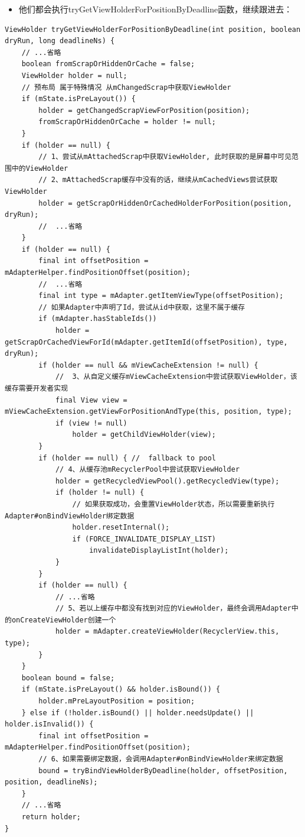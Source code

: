 \documentclass[9pt, b5paper]{article}
\begin{document}
\begin{itemize}
\item 他们都会执行tryGetViewHolderForPositionByDeadline函数，继续跟进去：
\end{itemize}
\begin{verbatim}
ViewHolder tryGetViewHolderForPositionByDeadline(int position, boolean dryRun, long deadlineNs) { 
    // ...省略     
    boolean fromScrapOrHiddenOrCache = false; 
    ViewHolder holder = null; 
    // 预布局 属于特殊情况 从mChangedScrap中获取ViewHolder 
    if (mState.isPreLayout()) { 
        holder = getChangedScrapViewForPosition(position); 
        fromScrapOrHiddenOrCache = holder != null; 
    } 
    if (holder == null) { 
        // 1、尝试从mAttachedScrap中获取ViewHolder, 此时获取的是屏幕中可见范围中的ViewHolder 
        // 2、mAttachedScrap缓存中没有的话，继续从mCachedViews尝试获取ViewHolder 
        holder = getScrapOrHiddenOrCachedHolderForPosition(position, dryRun); 
        //  ...省略 
    } 
    if (holder == null) { 
        final int offsetPosition = mAdapterHelper.findPositionOffset(position); 
        //  ...省略 
        final int type = mAdapter.getItemViewType(offsetPosition); 
        // 如果Adapter中声明了Id，尝试从id中获取，这里不属于缓存 
        if (mAdapter.hasStableIds()) 
            holder = getScrapOrCachedViewForId(mAdapter.getItemId(offsetPosition), type, dryRun); 
        if (holder == null && mViewCacheExtension != null) { 
            //  3、从自定义缓存mViewCacheExtension中尝试获取ViewHolder，该缓存需要开发者实现 
            final View view = mViewCacheExtension.getViewForPositionAndType(this, position, type); 
            if (view != null) 
                holder = getChildViewHolder(view); 
        } 
        if (holder == null) { //  fallback to pool 
            // 4、从缓存池mRecyclerPool中尝试获取ViewHolder 
            holder = getRecycledViewPool().getRecycledView(type); 
            if (holder != null) { 
                // 如果获取成功，会重置ViewHolder状态，所以需要重新执行Adapter#onBindViewHolder绑定数据 
                holder.resetInternal(); 
                if (FORCE_INVALIDATE_DISPLAY_LIST) 
                    invalidateDisplayListInt(holder); 
            } 
        } 
        if (holder == null) { 
            // ...省略 
            // 5、若以上缓存中都没有找到对应的ViewHolder，最终会调用Adapter中的onCreateViewHolder创建一个 
            holder = mAdapter.createViewHolder(RecyclerView.this, type); 
        } 
    } 
    boolean bound = false; 
    if (mState.isPreLayout() && holder.isBound()) { 
        holder.mPreLayoutPosition = position; 
    } else if (!holder.isBound() || holder.needsUpdate() || holder.isInvalid()) { 
        final int offsetPosition = mAdapterHelper.findPositionOffset(position); 
        // 6、如果需要绑定数据，会调用Adapter#onBindViewHolder来绑定数据 
        bound = tryBindViewHolderByDeadline(holder, offsetPosition, position, deadlineNs); 
    } 
    // ...省略 
    return holder; 
}
\end{verbatim}
\end{document}
